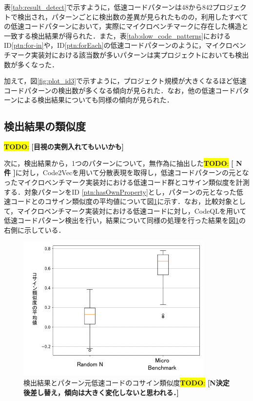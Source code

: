 \documentclass[submit,techrep,noauthor]{ipsj}
\newcommand{\todo}[1]{\colorbox{yellow}{{\bf TODO}:}{\color{red} {\textbf{[#1]}}}}
\begin{document}
表\ref{tab:result_detect}で示すように，低速コードパターンは48から842プロジェクトで検出され，パターンごとに検出数の差異が見られたものの，利用したすべての低速コードパターンにおいて，実際にマイクロベンチマークに存在した構造と一致する検出結果が得られた．また，表\ref{tab:slow_code_patterns}におけるID\ref{ptn:for-in}や，ID\ref{ptn:forEach}の低速コードパターンのように，マイクロベンチマーク実装対における該当数が多いパターンは実プロジェクトにおいても検出数が多くなった．

加えて，図\ref{fig:plot_id3}で示すように，プロジェクト規模が大きくなるほど低速コードパターンの検出数が多くなる傾向が見られた．なお，他の低速コードパターンによる検出結果についても同様の傾向が見られた．


\subsection{検出結果の類似度}\todo{目視の実例入れてもいいかも}

次に，検出結果から，1つのパターンについて，無作為に抽出した\todo{ N 件 }に対し，Code2Vecを用いて分散表現を取得し，低速コードパターンの元となったマイクロベンチマーク実装対における低速コード群とコサイン類似度を計測する．対象パターンをID \ref{ptn:hasOwnProperty}とし，パターンの元となった低速コードとのコサイン類似度の平均値について図\ref{fig:boxplot_cosine}に示す．なお，比較対象として，マイクロベンチマーク実装対における低速コードに対し，CodeQLを用いて低速コードパターン検出を行い，結果について同様の処理を行った結果を図\ref{fig:boxplot_cosine}の右側に示している．

\begin{figure}[h!]
    \centering
    \includegraphics[width=0.9\linewidth]{./Noguchi_fig/boxplot_compare.pdf}
    \caption{検出結果とパターン元低速コードのコサイン類似度\todo{N決定後差し替え，傾向は大きく変化しないと思われる．}}
    \label{fig:boxplot_cosine}
\end{figure}
\end{document}
